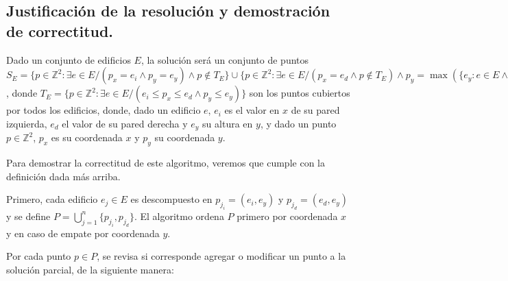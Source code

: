 \subsection{Justificación de la resolución y demostración de correctitud.}

\vspace*{0.3cm}


Dado un conjunto de edificios $E$, la solución será un conjunto de puntos
$S_E = \{p \in \mathbb{Z}^2 : \exists e \in E / (p_x = e_i \land p_y = e_y) \land
p \notin T_E\} \cup \{p \in \mathbb{Z}^2 : \exists e \in E / (p_x = e_d \land p
\notin T_E) \land p_y = \max({\{e_y : e \in E \land e_i \leq p_x < e_d\} \cup \{0\}})\}$,
donde $T_E = \{p \in \mathbb{Z}^2 : \exists e \in E / (e_i \leq p_x \leq e_d \land p_y \leq e_y)\}$
son los puntos cubiertos por todos los edificios, donde, dado un edificio
$e$, $e_i$ es el valor en $x$ de su pared izquierda, $e_d$ el valor de su
pared derecha y $e_y$ su altura en $y$, y dado un punto $p \in
\mathbb{Z}^2$, $p_x$ es su coordenada $x$ y $p_y$ su coordenada $y$.

Para demostrar la correctitud de este algoritmo, veremos que cumple con la
definición dada más arriba.

Primero, cada edificio $e_j \in E$ es descompuesto en $p_{j_i} = (e_i, e_y)$ y
$p_{j_d} = (e_d, e_y)$ y se define $P = \bigcup_{j=1}^n \{p_{j_i}, p_{j_d}\}$.
El algoritmo ordena $P$ primero por coordenada $x$ y en caso de empate por
coordenada $y$.

Por cada punto $p \in P$, se revisa si corresponde agregar o modificar un punto
a la solución parcial, de la siguiente manera:

